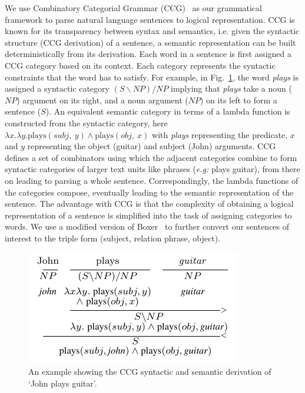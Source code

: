 \documentclass{llncs}
\begin{document}
We use Combinatory Categorial Grammar (CCG)~\cite{Steedman:2000:SP:332037} as our grammatical framework to parse natural language sentences to logical representation. CCG is known for its transparency between syntax and semantics, i.e. given the syntactic structure (CCG derivation) of a sentence, a semantic representation can be built deterministically from its derivation. Each word in a sentence is first assigned a CCG category based on its context. Each category represents the syntactic constraints that the word has to satisfy. For example, in Fig.~\ref{fig:ccg_sample}, the word \textit{plays} is assigned a syntactic category $(S\backslash NP)/NP$ implying that \textit{plays} take a noun ($NP$) argument on its right, and a noun argument ($NP$) on its left to form a sentence ($S$). An equivalent semantic category in terms of a lambda function is constructed from the syntactic category, here $\lambda x. \lambda y. \mathrm{plays}(subj,~y) \wedge \mathrm{plays}(obj,~x)$ with \textit{plays} representing the predicate, $x$ and $y$ representing the object (guitar) and subject (John) arguments. CCG defines a set of combinators using which the adjacent categories combine to form syntactic categories of larger text units like phrases (\textit{e.g:} plays guitar), from there on leading to parsing a whole sentence. Correspondingly, the lambda functions of the categories compose, eventually leading to the semantic representation of the sentence. The advantage with CCG is that the complexity of obtaining a logical representation of a sentence is simplified into the task of assigning categories to words. We use a modified version of Boxer~\cite{Bos2004} to further convert our sentences of interest to the triple form (subject, relation phrase, object).
\begin{figure}[!t]
\centering
\includegraphics[width=0.6\linewidth]{figures/ccg_sample.pdf}
\caption{An example showing the CCG syntactic and semantic derivation of `John plays guitar'.}
\label{fig:ccg_sample}
\end{figure}
\end{document}
